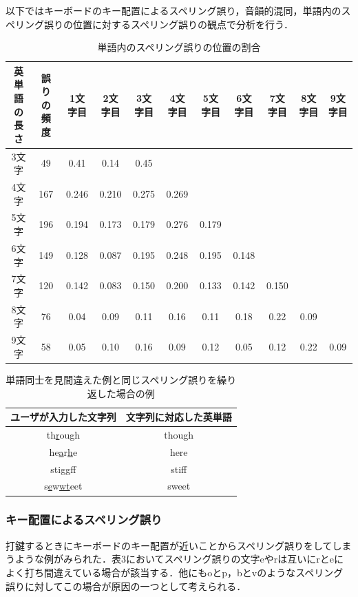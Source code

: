 \documentclass{jarticle}
\begin{document}
以下ではキーボードのキー配置によるスペリング誤り，音韻的混同，単語内のスペリング誤りの位置に対するスペリング誤りの観点で分析を行う．

 \begin{table}[t]
  \small
  \begin{center}
   \caption{単語内のスペリング誤りの位置の割合}
   \begin{tabular}{|c|c|c|c|c|c|c|c|c|c|c|} \hline
       	英単語の長さ & 誤りの頻度 & 1文字目 & 2文字目 & 3文字目 & 4文字目 & 5文字目 & 6文字目 & 7文字目 & 8文字目 & 9文字目\\ \hline
	    3文字 & 49 & 0.41 & 0.14 & 0.45 &  &  &  &  &  & \\ \hline
	    4文字 & 167 & 0.246 & 0.210 & 0.275 & 0.269 &  &  &  &  & \\ \hline
	    5文字 & 196 & 0.194 & 0.173 & 0.179 & 0.276 & 0.179 &  &  &  & \\ \hline
	    6文字 & 149 & 0.128 & 0.087 & 0.195 & 0.248 & 0.195 & 0.148 &  &  & \\ \hline
	    7文字 & 120 & 0.142 & 0.083 & 0.150 & 0.200 & 0.133 & 0.142 & 0.150 &  & \\ \hline
	    8文字 & 76 & 0.04 & 0.09 & 0.11 & 0.16 & 0.11 & 0.18 & 0.22 & 0.09 & \\ \hline
	    9文字 & 58 & 0.05 & 0.10 & 0.16 & 0.09 & 0.12 & 0.05 & 0.12 & 0.22 & 0.09 \\ \hline
   \end{tabular}
  \end{center}
 \end{table}

 \begin{table}[t]
  \small
  \begin{center}
   \caption{単語同士を見間違えた例と同じスペリング誤りを繰り返した場合の例}
   \begin{tabular}{|c|c|} \hline
       	ユーザが入力した文字列 & 文字列に対応した英単語\\ \hline
	    th\underline{r}ough & though\\ \hline
	    he\underline{a}r\underline{h}e & here\\ \hline
	    sti\underline{gg}ff & stiff\\ \hline
	    s\underline{e}w\underline{wt}eet & sweet\\ \hline
   \end{tabular}
  \end{center}
 \end{table}

\subsubsection{キー配置によるスペリング誤り}
打鍵するときにキーボードのキー配置が近いことからスペリング誤りをしてしまうような例がみられた．表3においてスペリング誤りの文字eやrは互いにrとeによく打ち間違えている場合が該当する．他にもoとp，bとvのようなスペリング誤りに対してこの場合が原因の一つとして考えられる．
\end{document}
